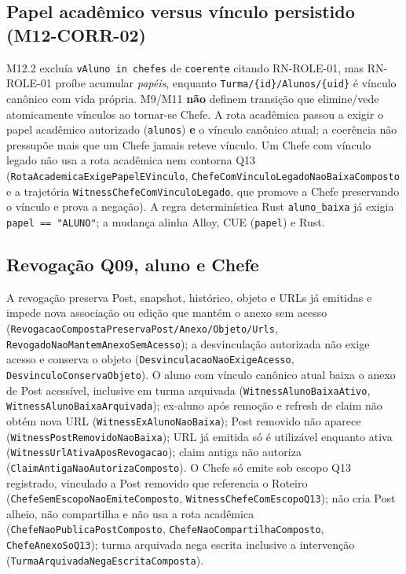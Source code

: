 \subsection*{Papel acadêmico versus vínculo persistido (M12-CORR-02)}
M12.2 excluía \texttt{vAluno in chefes} de \texttt{coerente} citando RN-ROLE-01,
mas RN-ROLE-01 proíbe acumular \emph{papéis}, enquanto
\texttt{Turma/\{id\}/Alunos/\{uid\}} é vínculo canônico com vida própria. M9/M11
\textbf{não} definem transição que elimine/vede atomicamente vínculos ao tornar-se
Chefe. A rota acadêmica passou a exigir o papel acadêmico autorizado
(\texttt{alunos}) \textbf{e} o vínculo canônico atual; a coerência não pressupõe
mais que um Chefe jamais reteve vínculo. Um Chefe com vínculo legado não usa a
rota acadêmica nem contorna Q13 (\texttt{RotaAcademicaExigePapelEVinculo},
\texttt{ChefeComVinculoLegadoNaoBaixaComposto} e a trajetória
\texttt{WitnessChefeComVinculoLegado}, que promove a Chefe preservando o vínculo e
prova a negação). A regra determinística Rust \texttt{aluno\_baixa} já exigia
\texttt{papel == "ALUNO"}; a mudança alinha Alloy, CUE (\texttt{papel}) e Rust.

\subsection*{Revogação Q09, aluno e Chefe}
A revogação preserva Post, snapshot, histórico, objeto e URLs já emitidas e impede
nova associação ou edição que mantém o anexo sem acesso
(\texttt{RevogacaoCompostaPreservaPost/Anexo/Objeto/Urls},
\texttt{RevogadoNaoMantemAnexoSemAcesso}); a desvinculação autorizada não exige
acesso e conserva o objeto (\texttt{DesvinculacaoNaoExigeAcesso},
\texttt{DesvinculoConservaObjeto}). O aluno com vínculo canônico atual baixa o
anexo de Post acessível, inclusive em turma arquivada
(\texttt{WitnessAlunoBaixaAtivo}, \texttt{WitnessAlunoBaixaArquivada}); ex-aluno
após remoção e refresh de claim não obtém nova URL
(\texttt{WitnessExAlunoNaoBaixa}); Post removido não aparece
(\texttt{WitnessPostRemovidoNaoBaixa}); URL já emitida só é utilizável enquanto
ativa (\texttt{WitnessUrlAtivaAposRevogacao}); claim antiga não autoriza
(\texttt{ClaimAntigaNaoAutorizaComposto}). O Chefe só emite sob escopo Q13
registrado, vinculado a Post removido que referencia o Roteiro
(\texttt{ChefeSemEscopoNaoEmiteComposto},
\texttt{WitnessChefeComEscopoQ13}); não cria Post alheio, não compartilha e não
usa a rota acadêmica (\texttt{ChefeNaoPublicaPostComposto},
\texttt{ChefeNaoCompartilhaComposto}, \texttt{ChefeAnexoSoQ13}); turma arquivada
nega escrita inclusive a intervenção (\texttt{TurmaArquivadaNegaEscritaComposta}).


